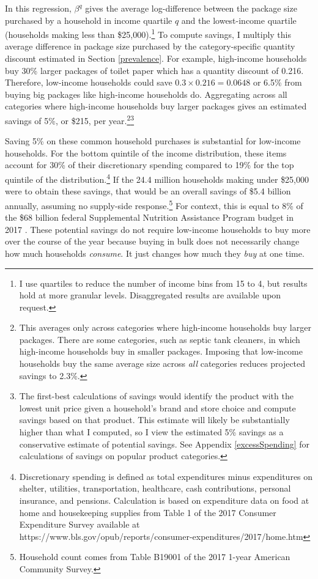 \documentclass[AER]{AEA_mal}
\begin{document}
In this regression, $\beta^q$ gives the average log-difference between the package size purchased by a household in income quartile $q$ and the lowest-income quartile (households making less than \$25,000).\footnote{I use quartiles to reduce the number of income bins from 15 to 4, but results hold at more granular levels. Disaggregated results are available upon request.} To compute savings, I multiply this average difference in package size purchased by the category-specific quantity discount estimated in Section \ref{prevalence}. For example, high-income households buy 30\% larger packages of toilet paper which has a quantity discount of 0.216. Therefore, low-income households could save $0.3 \times 0.216 = 0.0648$ or 6.5\% from buying big packages like high-income households do. Aggregating across all categories where high-income households buy larger packages gives an estimated savings of 5\%, or \$215, per year.\footnote{This averages only across categories where high-income households buy larger packages. There are some categories, such as septic tank cleaners, in which high-income households buy in smaller packages. Imposing that low-income households buy the same average size across \textit{all} categories reduces projected savings to 2.3\%.}\footnote{The first-best calculations of savings would identify the product with the lowest unit price given a household's brand and store choice and compute savings based on that product. This estimate will likely be substantially higher than what I computed, so I view the estimated 5\% savings as a conservative estimate of potential savings. See Appendix \ref{excessSpending} for calculations of savings on popular product categories.}

Saving 5\% on these common household purchases is substantial for low-income households. For the bottom quintile of the income distribution, these items account for 30\% of their discretionary spending compared to 19\% for the top quintile of the distribution.\footnote{Discretionary spending is defined as total expenditures minus expenditures on shelter, utilities, transportation, healthcare, cash contributions, personal insurance, and pensions. Calculation is based on expenditure data on food at home and housekeeping supplies from Table 1 of the 2017 Consumer Expenditure Survey available at https://www.bls.gov/opub/reports/consumer-expenditures/2017/home.htm} If the 24.4 million households making under \$25,000 were to obtain these savings, that would be an overall savings of \$5.4 billion annually, assuming no supply-side response.\footnote{Household count comes from Table B19001 of the 2017 1-year American Community Survey.} For context, this is equal to 8\% of the \$68 billion federal Supplemental Nutrition Assistance Program budget in 2017 \citep{snap2019}. These potential savings do not require low-income households to buy more over the course of the year because buying in bulk does not necessarily change how much households \textit{consume}. It just changes how much they \textit{buy} at one time.
\end{document}
